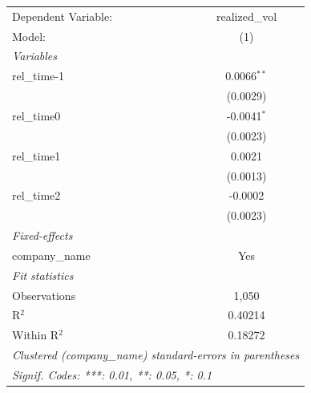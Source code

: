 
\begingroup
\centering
\begin{tabular}{lc}
   \tabularnewline \midrule \midrule
   Dependent Variable: & realized\_vol\\   
   Model:              & (1)\\  
   \midrule
   \emph{Variables}\\
   rel\_time-1         & 0.0066$^{**}$\\   
                       & (0.0029)\\   
   rel\_time0          & -0.0041$^{*}$\\   
                       & (0.0023)\\   
   rel\_time1          & 0.0021\\   
                       & (0.0013)\\   
   rel\_time2          & -0.0002\\   
                       & (0.0023)\\   
   \midrule
   \emph{Fixed-effects}\\
   company\_name       & Yes\\  
   \midrule
   \emph{Fit statistics}\\
   Observations        & 1,050\\  
   R$^2$               & 0.40214\\  
   Within R$^2$        & 0.18272\\  
   \midrule \midrule
   \multicolumn{2}{l}{\emph{Clustered (company\_name) standard-errors in parentheses}}\\
   \multicolumn{2}{l}{\emph{Signif. Codes: ***: 0.01, **: 0.05, *: 0.1}}\\
\end{tabular}
\par\endgroup



